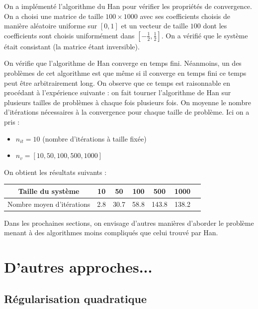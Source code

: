 \documentclass[10pt,a4paper]{article}
\begin{document}
On a implémenté l'algorithme du Han pour vérifier les propriétés de convergence. On a choisi une matrice de taille $100 \times 1000$ avec ses coefficients choisis de manière aléatoire uniforme sur $[0,1]$ et un vecteur de taille $100$ dont les coefficients sont choisis uniformément dans $[-\frac{1}{2},\frac{1}{2}]$.
On a vérifié que le système était consistant (la matrice étant inversible).

On vérifie que l'algorithme de Han converge en temps fini. Néanmoins, un des problèmes de cet algorithme est que même si il converge en temps fini ce temps peut être arbitrairement long. On observe que ce temps est raisonnable en procédant à l'expérience suivante : on fait tourner l'algorithme de Han sur plusieurs tailles de problèmes à chaque fois plusieurs fois. On moyenne le nombre d'itérations nécessaires à la convergence pour chaque taille de problème. Ici on a pris :
\begin{itemize}
\item $n_{it}=10$ (nombre d'itérations à taille fixée) 
\item $n_v=[10, 50, 100, 500, 1000]$
\end{itemize}
On obtient les résultats suivants :

\begin{tabular}{|c|c|c|c|c|c|c|}
\hline
Taille du système & 10 & 50 & 100 & 500 & 1000 \\
\hline
Nombre moyen d'itérations  &  2.8 & 30.7 & 58.8 & 143.8 & 138.2 \\ \hline
\end{tabular}

Dans les prochaines sections, on envisage d'autres manières d'aborder le problème menant à des algorithmes moins compliqués que celui trouvé par Han.

\section{D'autres approches...}

\subsection{Régularisation quadratique}
\end{document}
